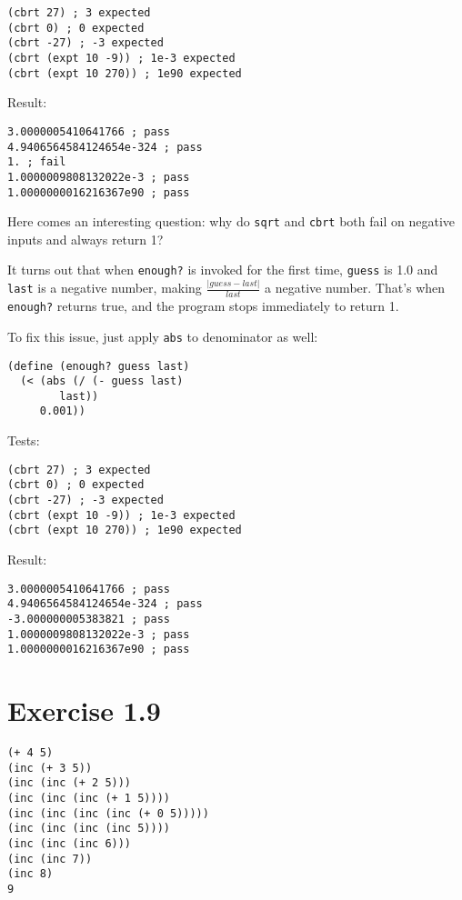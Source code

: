 \documentclass[../main.tex]{subfiles}
\begin{document}
\begin{lstlisting}
(cbrt 27) ; 3 expected
(cbrt 0) ; 0 expected
(cbrt -27) ; -3 expected
(cbrt (expt 10 -9)) ; 1e-3 expected
(cbrt (expt 10 270)) ; 1e90 expected
\end{lstlisting}

Result:

\begin{lstlisting}
3.0000005410641766 ; pass
4.9406564584124654e-324 ; pass
1. ; fail
1.0000009808132022e-3 ; pass
1.0000000016216367e90 ; pass
\end{lstlisting}

Here comes an interesting question: why do
 \lstinline{sqrt} and \lstinline{cbrt}
 both fail on negative inputs and always
 return 1?

It turns out that when \lstinline{enough?} is invoked
 for the first time, \lstinline{guess} is 1.0 and
 \lstinline{last} is a negative number, making
 $\frac{|guess-last|}{last}$ a negative number. That's
 when \lstinline{enough?} returns true, and the
 program stops immediately to return 1.

To fix this issue, just apply \lstinline{abs} to
 denominator as well:

\begin{lstlisting}
(define (enough? guess last)
  (< (abs (/ (- guess last)
        last))
     0.001))
\end{lstlisting}

Tests:

\begin{lstlisting}
(cbrt 27) ; 3 expected
(cbrt 0) ; 0 expected
(cbrt -27) ; -3 expected
(cbrt (expt 10 -9)) ; 1e-3 expected
(cbrt (expt 10 270)) ; 1e90 expected
\end{lstlisting}

Result:

\begin{lstlisting}
3.0000005410641766 ; pass
4.9406564584124654e-324 ; pass
-3.000000005383821 ; pass
1.0000009808132022e-3 ; pass
1.0000000016216367e90 ; pass
\end{lstlisting}

\section{Exercise 1.9}

\begin{lstlisting}
(+ 4 5)
(inc (+ 3 5))
(inc (inc (+ 2 5)))
(inc (inc (inc (+ 1 5))))
(inc (inc (inc (inc (+ 0 5)))))
(inc (inc (inc (inc 5))))
(inc (inc (inc 6)))
(inc (inc 7))
(inc 8)
9
\end{lstlisting}
\end{document}

